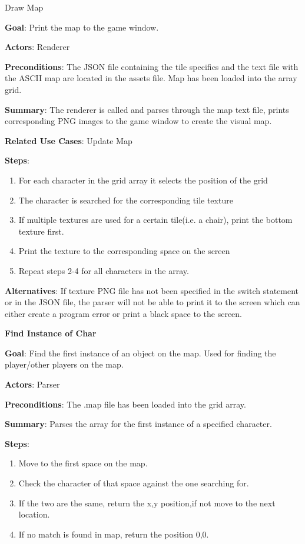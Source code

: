 \documentclass[12pt]{report}
\begin{document}
\begin{subsection}{Draw Map}

\textbf{Goal}: 
Print the map to the game window.

\textbf{Actors}: 
Renderer

\textbf{Preconditions}: 
The JSON file containing the tile specifics and the text file with the ASCII map are located in the assets file. Map has been loaded into the array grid.

\textbf{Summary}: 
The renderer is called and parses through the map text file, prints corresponding PNG images to the game window to create the visual map.

\textbf{Related Use Cases}: 
Update Map

\textbf{Steps}:
\begin{enumerate}
	\item For each character in the grid array it selects the position of the grid
	\item The character is searched for the corresponding tile texture
	\item If multiple textures are used for a certain tile(i.e. a chair), print the bottom texture first.
	\item Print the texture to the corresponding space on the screen
	\item Repeat steps 2-4 for all characters in the array.
\end{enumerate}

\textbf{Alternatives}: 
If texture PNG file has not been specified in the switch statement or in the JSON file, the parser will not be able to print it to the screen which can either create a program error or print a black space to the screen.

\textbf{Find Instance of Char}

\textbf{Goal}: 
Find the first instance of an object on the map. Used for finding the player/other players on the map.

\textbf{Actors}: 
Parser

\textbf{Preconditions}: 
The .map file has been loaded into the grid array.

\textbf{Summary}: 
Parses the array for the first instance of a specified character.

\textbf{Steps}:
\begin{enumerate}
	\item Move to the first space on the map.
	\item Check the character of that space against the one searching for.
	\item If the two are the same, return the x,y position,if not move to the next location.
	\item If no match is found in map, return the position 0,0.
\end{enumerate}


\end{subsection}
\end{document}
